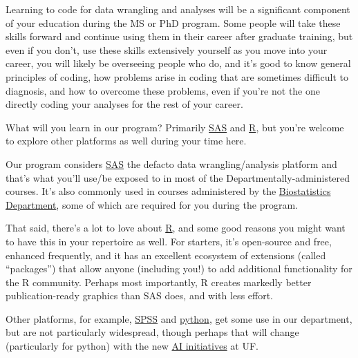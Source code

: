 \documentclass[
  letterpaper,
  DIV=11,
  numbers=noendperiod]{scrreprt}
\begin{document}
Learning to code for data wrangling and analyses will be a significant
component of your education during the MS or PhD program. Some people
will take these skills forward and continue using them in their career
after graduate training, but even if you don't, use these skills
extensively yourself as you move into your career, you will likely be
overseeing people who do, and it's good to know general principles of
coding, how problems arise in coding that are sometimes difficult to
diagnosis, and how to overcome these problems, even if you're not the
one directly coding your analyses for the rest of your career.

What will you learn in our program? Primarily
\href{https://www.sas.com/en_us/home.html}{SAS} and
\href{https://cran.r-project.org/}{R}, but you're welcome to explore
other platforms as well during your time here.

\begin{tcolorbox}[enhanced jigsaw, colframe=quarto-callout-note-color-frame, opacityback=0, leftrule=.75mm, bottomrule=.15mm, rightrule=.15mm, left=2mm, toptitle=1mm, colback=white, bottomtitle=1mm, titlerule=0mm, title=\textcolor{quarto-callout-note-color}{\faInfo}\hspace{0.5em}{Note}, arc=.35mm, toprule=.15mm, breakable, coltitle=black, colbacktitle=quarto-callout-note-color!10!white, opacitybacktitle=0.6]

Our program considers \href{https://www.sas.com/en_us/home.html}{SAS}
the defacto data wrangling/analysis platform and that's what you'll
use/be exposed to in most of the Departmentally-administered courses.
It's also commonly used in courses administered by the
\href{https://biostat.ufl.edu/}{Biostatistics Department}, some of which
are required for you during the program.

That said, there's a lot to love about
\href{https://cran.r-project.org/}{R}, and some good reasons you might
want to have this in your repertoire as well. For starters, it's
open-source and free, enhanced frequently, and it has an excellent
ecosystem of extensions (called ``packages'') that allow anyone
(including you!) to add additional functionality for the R community.
Perhaps most importantly, R creates markedly better publication-ready
graphics than SAS does, and with less effort.

\end{tcolorbox}

Other platforms, for example,
\href{https://www.ibm.com/products/spss-statistics}{SPSS} and
\href{https://www.python.org/}{python}, get some use in our department,
but are not particularly widespread, though perhaps that will change
(particularly for python) with the new \href{https://ai.ufl.edu/}{AI
initiatives} at UF.
\end{document}
